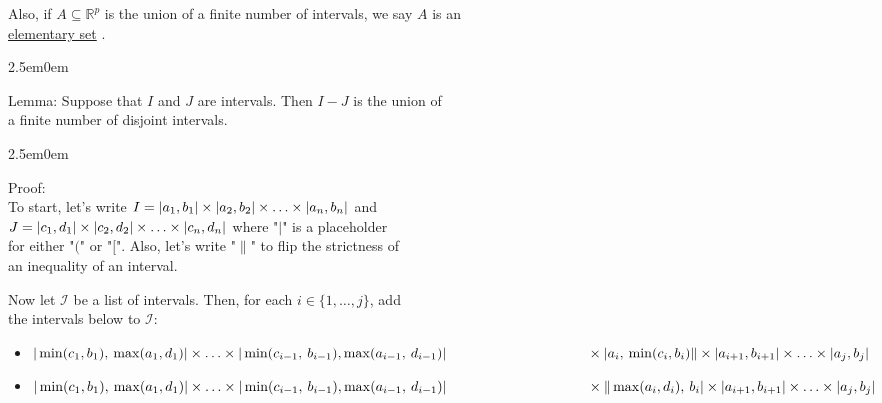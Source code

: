 \documentclass{book}
\newcommand{\exOne}{%
   \color{Purple}%
   \fontsize{14}{16}\selectfont%
}
\newcommand{\exTwo}{%
   \color{RedViolet}%
   \fontsize{13}{15}\selectfont%
}
\newenvironment{myIndent}{%
   \begin{adjustwidth}{2.5em}{0em}%
}{%
   \end{adjustwidth}%
}
\newcommand{\udefine}[1]{{%
   \setulcolor{Red}%
   \setul{0.14em}{0.07em}%
   \ul{#1}%
}}
\newcommand{\retTwo}{\hfill\bigbreak}
\begin{document}
Also, if $A \subseteq \mathbb{R}^p$ is the union of a finite number of intervals, we say $A$ is an\\ \udefine{elementary set}.\\ [-10pt]

{\begin{myIndent}\exOne
   Lemma: Suppose that $I$ and $J$ are intervals. Then $I - J$ is the union of\\ a finite number of disjoint intervals.

   {\begin{myIndent}\exTwo
      Proof:\\
      To start, let's write $I = |a_1, b_1| \times |a_2, b_2| \times \ldots \times |a_n, b_n|\hspace{0.05em}$ and\\ $J = |c_1, d_1| \times |c_2, d_2| \times \ldots \times |c_n, d_n|\hspace{0.05em}$ where "$\mid$" is a placeholder\\ for either "$ \lparen $" or "$ \lbrack $". Also, let's write "$\|$" to flip the strictness of\\ an inequality of an interval.\retTwo

      Now let $\mathcal{I}$ be a list of intervals. Then, for each $i \in \{1,\ldots, j\}$, add\\ the intervals below to $\mathcal{I}$:
      {\begin{itemize}\fontsize{12}{14}\selectfont
         \item $|\min(c_1, b_1),\hspace{0.2em} \max(a_1, d_1)|\times\ldots\times |\min(c_{i-1},\hspace{0.2em} b_{i-1}), \max(a_{i-1},\hspace{0.2em} d_{i-1})| \\ \phantom{aaaaaaaaaaaaaaaaaaa}\times  |a_i,\hspace{0.2em} \min(c_i, b_i)\| \times |a_{i+1}, b_{i+1}|\times\ldots\times |a_{j}, b_j|$\\ [-8pt]
         \item $|\min(c_1, b_1),\hspace{0.2em} \max(a_1, d_1)|\times\ldots\times |\min(c_{i-1},\hspace{0.2em} b_{i-1}), \max(a_{i-1},\hspace{0.2em} d_{i-1})| \\ \phantom{aaaaaaaaaaaaaaaaaaa}\times  \|\max(a_i, d_i),\hspace{0.2em} b_i| \times |a_{i+1}, b_{i+1}|\times\ldots\times |a_{j}, b_j|$\retTwo
      \end{itemize}}
      

\end{myIndent}}
\end{myIndent}}
\end{document}
